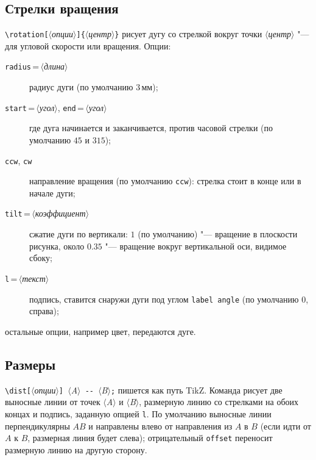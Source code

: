\documentclass[a4paper,11pt]{article}
\newcommand\key[1]{\texttt{#1}}
\newcommand\meta[1]{\ensuremath{\langle}\textit{#1}\ensuremath{\rangle}}
\begin{document}
\subsection{Стрелки вращения}
\verb|\rotation[|\meta{опции}\verb|]{|\meta{центр}\verb|}| рисует дугу со
стрелкой вокруг точки \meta{центр} "--- для угловой скорости или вращения.
Опции:
\begin{description}
  \item[\key{radius}\,=\,\meta{длина}] радиус дуги (по умолчанию
    \(3\,\text{мм}\));
  \item[\key{start}\,=\,\meta{угол}, \key{end}\,=\,\meta{угол}] где дуга
    начинается и заканчивается, против часовой стрелки (по умолчанию \(45\)
    и \(315\));
  \item[\key{ccw}, \key{cw}] направление вращения (по умолчанию
    \key{ccw}): стрелка стоит в конце или в начале дуги;
  \item[\key{tilt}\,=\,\meta{коэффициент}] сжатие дуги по вертикали: \(1\)
    (по умолчанию) "--- вращение в плоскости рисунка, около \(0.35\) "---
    вращение вокруг вертикальной оси, видимое сбоку;
  \item[\key{l}\,=\,\meta{текст}] подпись, ставится снаружи дуги под углом
    \key{label angle} (по умолчанию \(0\), справа);
\end{description}
остальные опции, например цвет, передаются дуге.
\begin{example}
\end{example}

\subsection{Размеры}
\verb|\dist[|\meta{опции}\verb|] |\meta{A}\verb| -- |\meta{B}\verb|;|
пишется как путь TikZ. Команда рисует две выносные линии от точек \meta{A}
и \meta{B}, размерную линию со стрелками на обоих концах и подпись, заданную
опцией \key{l}. По умолчанию выносные линии перпендикулярны \(AB\) и
направлены влево от направления из \(A\) в \(B\) (если идти от \(A\) к \(B\),
размерная линия будет слева); отрицательный \key{offset} переносит размерную
линию на другую сторону.
\begin{example}
\end{example}
\end{document}
